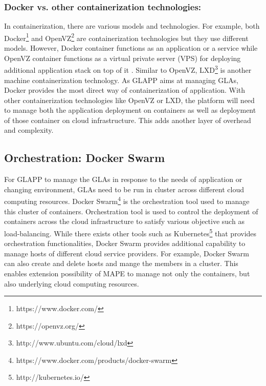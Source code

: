 \documentclass{seal_thesis}
\begin{document}
\subsubsection{Docker vs. other containerization technologies:}
In containerization, there are various models and technologies.
For example, both Docker\footnote{https://www.docker.com/} and OpenVZ\footnote{https://openvz.org/} are containerization technologies but they use different models.
However, Docker container functions as an application or a service while OpenVZ container functions as a virtual private server (VPS) for deploying additional application stack on top of it \cite{openvz}.
Similar to OpenVZ, LXD\footnote{http://www.ubuntu.com/cloud/lxd} is another machine containerization technology.
As GLAPP aims at managing GLAs, Docker provides the most direct way of containerization of application.
With other containerization technologies like OpenVZ or LXD, the platform will need to manage both the application deployment on containers as well as deployment of those container on cloud infrastructure.
This adds another layer of overhead and complexity.


\subsection{Orchestration: Docker Swarm}
For GLAPP to manage the GLAs in response to the needs of application or changing environment, GLAs need to be run in cluster across different cloud computing resources.
Docker Swarm\footnote{https://www.docker.com/products/docker-swarm} is the orchestration tool used to manage this cluster of containers.
Orchestration tool is used to control the deployment of containers across the cloud infrastructure to satisfy various objective such as load-balancing.
While there exists other tools such as Kubernetes\footnote{http://kubernetes.io/} that provides orchestration functionalities, Docker Swarm provides additional capability to manage hosts of different cloud service providers.
For example, Docker Swarm can also create and delete hosts and mange the members in a cluster.
This enables extension possibility of MAPE to manage not only the containers, but also underlying cloud computing resources.
\end{document}
